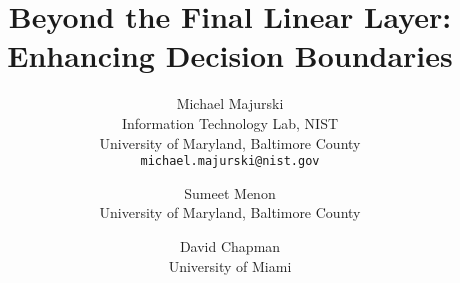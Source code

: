 \documentclass[10pt,twocolumn,letterpaper]{article}
\begin{document}
	
\title{Beyond the Final Linear Layer: Enhancing Decision Boundaries}

\author{Michael Majurski\\
	Information Technology Lab, NIST\\
	University of Maryland, Baltimore County\\
	{\tt\small michael.majurski@nist.gov}
\and
Sumeet Menon\\
University of Maryland, Baltimore County\\
\and
David Chapman\\
University of Miami\\
}

\maketitle




%
\end{document}
